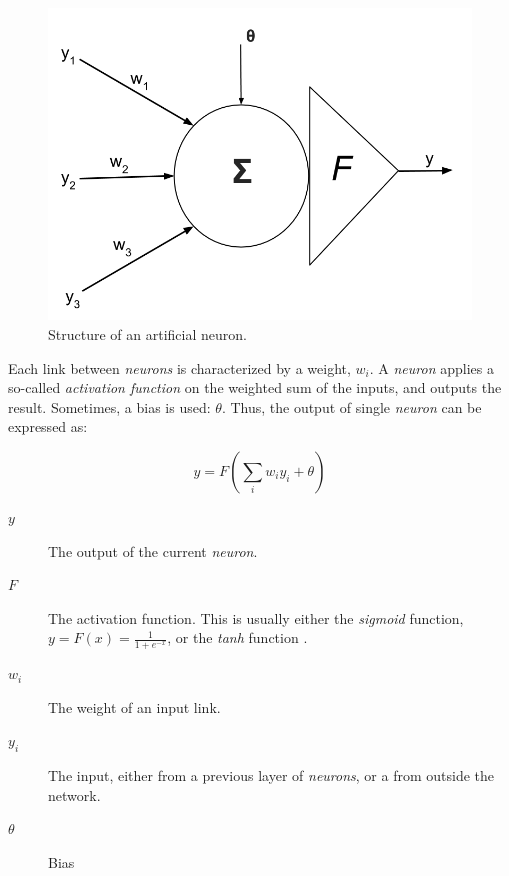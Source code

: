 \begin{figure}[h]
	\begin{center}
		\includegraphics[scale=0.3]{figures/neuron.png}
	\end{center}
	
	\caption{Structure of an artificial neuron.}
	\label{pic:neuron}

\end{figure}

Each link between \textit{neurons} is characterized by a weight, $w_i$. A \textit{neuron} applies a so-called \textit{activation function} on the weighted sum of the inputs, and outputs the result. Sometimes, a bias is used: $\theta$. Thus, the output of single \textit{neuron} can be expressed as:

\begin{equation*}
y = F(\sum_i w_i y_i + \theta)
\end{equation*}

\begin{description}
  \item[$y$]   The output of the current \textit{neuron}.
  \item[$F$]   The activation function. This is usually either the \textit{sigmoid} function, $y = F(x) = \frac{1}{1 + e^{-x}}$, or the \textit{tanh} function \cite{annintroduction}.
  \item[$w_i$] The weight of an input link.
  \item[$y_i$] The input, either from a previous layer of \textit{neurons}, or a from outside the network.
  \item[$\theta$] Bias
\end{description}

